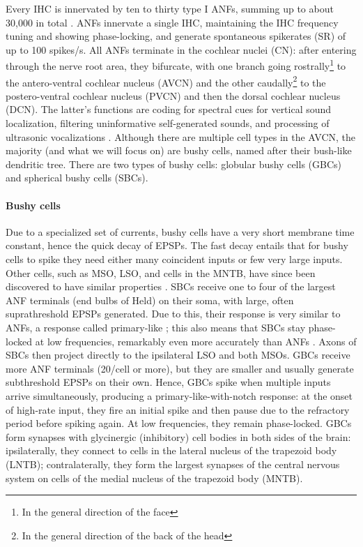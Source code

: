 \documentclass[11pt,a4paper]{article}
\begin{document}
Every IHC is innervated by ten to thirty type I ANFs, summing up to about 30,000 in total \cite{spoendlinAnalysisHumanAuditory1989}. ANFs innervate a single IHC, maintaining the IHC frequency tuning and showing phase-locking, and generate spontaneous spikerates (SR) of up to 100 spikes/s. All ANFs terminate in the cochlear nuclei (CN): after entering through the nerve root area, they bifurcate, with one branch going rostrally\footnote{In the general direction of the face} to the antero-ventral cochlear nucleus (AVCN) and the other caudally\footnote{In the general direction of the back of the head} to the postero-ventral cochlear nucleus (PVCN) and then the dorsal cochlear nucleus (DCN). The latter's functions are coding for spectral cues for vertical sound localization, filtering uninformative self-generated sounds, and processing of ultrasonic vocalizations \cite{yinNeuralMechanismsBinaural2019}. Although there are multiple cell types in the AVCN, the majority (and what we will focus on) are bushy cells, named after their bush-like dendritic tree. There are two types of bushy cells: globular bushy cells (GBCs) and spherical bushy cells (SBCs).

\paragraph{Bushy cells}
Due to a specialized set of currents, bushy cells have a very short membrane time constant, hence the quick decay of EPSPs. The fast decay entails that for bushy cells to spike they need either many coincident inputs or few very large inputs. Other cells, such as MSO, LSO, and cells in the MNTB, have since been discovered to have similar properties \cite{khuranaDynamicInteractionIh2011}\cite{yinNeuralMechanismsBinaural2019}. 
SBCs receive one to four of the largest ANF terminals (end bulbs of Held) on their soma, with large, often suprathreshold EPSPs generated. Due to this, their response is very similar to ANFs, a response called primary-like \cite{pfeifferClassificationResponsePatterns1966}; this also means that SBCs stay phase-locked at low frequencies, remarkably even more accurately than ANFs \cite{jorisEnhancementNeuralSynchronization1994}. Axons of SBCs then project directly to the ipsilateral LSO and both MSOs.
GBCs receive more ANF terminals (20/cell or more), but they are smaller and usually generate subthreshold EPSPs on their own. Hence, GBCs spike when multiple inputs arrive simultaneously, producing a primary-like-with-notch response: at the onset of high-rate input, they fire an initial spike and then pause due to the refractory period before spiking again. At low frequencies, they remain phase-locked.
GBCs form synapses with glycinergic (inhibitory) cell bodies in both sides of the brain: ipsilaterally, they connect to cells in the lateral nucleus of the trapezoid body (LNTB); contralaterally, they form the largest synapses of the central nervous system on cells of the medial nucleus of the trapezoid body (MNTB).
\end{document}
